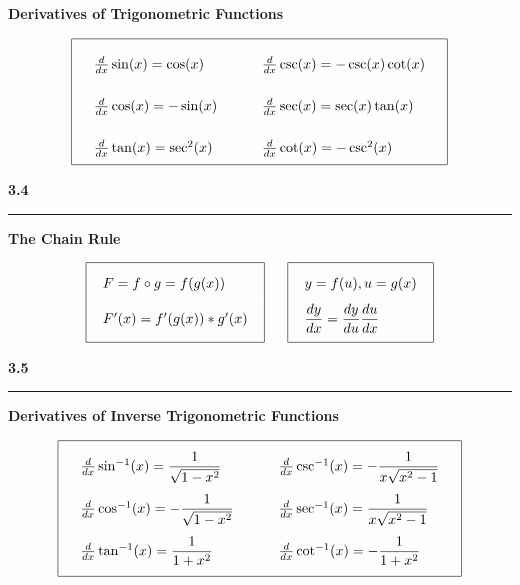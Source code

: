 \documentclass{article}
\begin{document}
\begin{center}
\large\textbf{Derivatives of Trigonometric Functions}
\begin{large}
\[\arraycolsep=16pt\def\arraystretch{2.5}
\begin{array}{| l l |}
	\hline
	\frac{d}{dx} \sin(x) = \cos(x) & \frac{d}{dx} \csc (x) = -\csc(x) \cot(x) \\
	\frac{d}{dx} \cos(x) = -\sin(x) & \frac{d}{dx} \sec (x) = \sec(x) \tan(x) \\
	\frac{d}{dx} \tan(x) = \sec^2(x) & \frac{d}{dx} \cot (x) = -\csc^2(x) \\
	\hline
\end{array}
\]
\end{large}
\vspace{16pt}

\Large\textbf{3.4}

\noindent\hfill\rule{0.3\textwidth}{.4pt}\hfill
\vspace{12pt}

\large\textbf{The Chain Rule}\\
\begin{large}
\[\arraycolsep=12pt\def\arraystretch{2.1}
\begin{array}{|l|}
	\hline
	F = f \circ g = f(g(x)) \\
	F'(x) = f'(g(x)) * g'(x) \\
	[\medskipamount]
	\hline
	\end{array} \mkern30mu 
\begin{array}{|l|}
	\hline
	y = f(u), u = g(x) \\
	\dfrac{dy}{dx} = \dfrac{dy}{du} \dfrac{du}{dx} \\
	[\medskipamount]
	\hline
	\end{array}
\]
\end{large}
\end{center}
\vspace{16pt}

\begin{center}
\Large\textbf{3.5}

\noindent\hfill\rule{0.3\textwidth}{.4pt}\hfill
\vspace{12pt}

\large\textbf{Derivatives of Inverse Trigonometric Functions}
\begin{large}
\[\arraycolsep=16pt\def\arraystretch{2.5}
\begin{array}{| l l |}
	\hline
	\frac{d}{dx} \sin^{-1}(x) = \dfrac{1}{\sqrt{1-x^2}} & \frac{d}{dx} \csc^{-1}(x) =  -\dfrac{1}{x\sqrt{x^2-1}} \\
	\frac{d}{dx} \cos^{-1}(x) = -\dfrac{1}{\sqrt{1-x^2}} & \frac{d}{dx} \sec^{-1}(x) = \dfrac{1}{x\sqrt{x^2-1}} \\
	\frac{d}{dx} \tan^{-1}(x) = \dfrac{1}{1+x^2} & \frac{d}{dx} \cot^{-1}(x) =  -\dfrac{1}{1+x^2} \\
	[\medskipamount]	
	\hline
\end{array}
\]
\end{large}
\end{center}
\pagebreak
\end{document}

